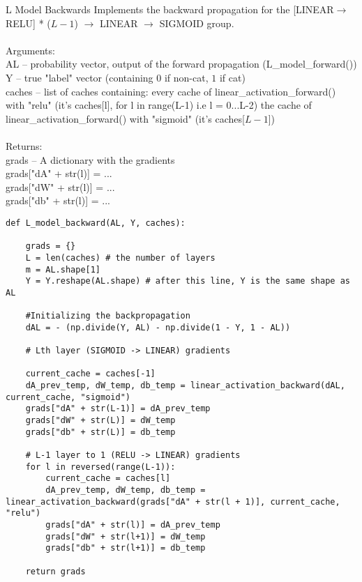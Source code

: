 \documentclass[a4paper]{article}
\begin{document}
\begin{enumerate}
\begin{alg}{L Model Backwards}{} Implements the backward propagation for the [LINEAR$\to$RELU] * ($L-1$) $\to$ LINEAR $\to$ SIGMOID group. \\~\\
Arguments: \\
AL -- probability vector, output of the forward propagation (L\_model\_forward())\\
Y -- true "label" vector (containing $0$ if non-cat, $1$ if cat)\\
caches -- list of caches containing: every cache of linear\_activation\_forward() with "relu" (it's caches[l], for l in range(L-1) i.e l = 0...L-2) the cache of linear\_activation\_forward() with "sigmoid" (it's caches[$L-1$])\\~\\
Returns: \\
grads -- A dictionary with the gradients\\
grads["dA" + str(l)] = ... \\
grads["dW" + str(l)] = ...\\
grads["db" + str(l)] = ... \\
\begin{verbatim}
def L_model_backward(AL, Y, caches):

    grads = {}
    L = len(caches) # the number of layers
    m = AL.shape[1]
    Y = Y.reshape(AL.shape) # after this line, Y is the same shape as AL
    
    #Initializing the backpropagation
    dAL = - (np.divide(Y, AL) - np.divide(1 - Y, 1 - AL))
    
    # Lth layer (SIGMOID -> LINEAR) gradients

    current_cache = caches[-1]
    dA_prev_temp, dW_temp, db_temp = linear_activation_backward(dAL, current_cache, "sigmoid")
    grads["dA" + str(L-1)] = dA_prev_temp
    grads["dW" + str(L)] = dW_temp
    grads["db" + str(L)] = db_temp
    
    # L-1 layer to 1 (RELU -> LINEAR) gradients
    for l in reversed(range(L-1)):
        current_cache = caches[l]
        dA_prev_temp, dW_temp, db_temp = linear_activation_backward(grads["dA" + str(l + 1)], current_cache, "relu")
        grads["dA" + str(l)] = dA_prev_temp
        grads["dW" + str(l+1)] = dW_temp
        grads["db" + str(l+1)] = db_temp

    return grads
\end{verbatim}
\end{alg}


\end{enumerate}
\end{document}
